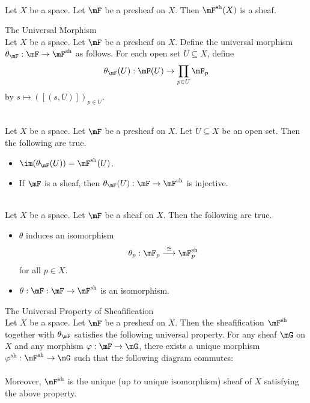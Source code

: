 \documentclass[a4paper]{article}
\begin{document}
\begin{lmm}{}{}\\
Let $X$ be a space. Let $\mF$ be a presheaf on $X$. Then $\mF^\text{sh}(X)$ is a sheaf. 
\end{lmm}

\begin{defn}{The Universal Morphism}{}\\
Let $X$ be a space. Let $\mF$ be a presheaf on $X$. Define the universal morphism $\theta_\mF:\mF\to\mF^\text{sh}$ as follows. For each open set $U\subseteq X$, define $$\theta_\mF(U):\mF(U)\to\prod_{p\in U}\mF_p$$ by $s\mapsto([(s,U)])_{p\in U}$. 
\end{defn}

\begin{lmm}{}{}\\
Let $X$ be a space. Let $\mF$ be a presheaf on $X$. Let $U\subseteq X$ be an open set. Then the following are true. 
\begin{itemize}
\item $\im(\theta_\mF(U))=\mF^\text{sh}(U)$. 
\item If $\mF$ is a sheaf, then $\theta_\mF(U):\mF\to\mF^\text{sh}$ is injective. 
\end{itemize}
\end{lmm}

\begin{lmm}{}{}\\
Let $X$ be a space. Let $\mF$ be a sheaf on $X$. Then the following are true. 
\begin{itemize}
\item $\theta$ induces an isomorphism $$\theta_p:\mF_p\overset{\cong}{\longrightarrow}\mF_p^\text{sh}$$ for all $p\in X$. 
\item $\theta:\mF:\mF\to\mF^\text{sh}$ is an isomorphism. 
\end{itemize}
\end{lmm}

\begin{prp}{The Universal Property of Sheafification}{}\\
Let $X$ be a space. Let $\mF$ be a presheaf on $X$. Then the sheafification $\mF^\text{sh}$ together with $\theta_\mF$ satisfies the following universal property. For any sheaf $\mG$ on $X$ and any morphism $\varphi:\mF\to\mG$, there exists a unique morphism $\varphi^\text{sh}:\mF^\text{sh}\to\mG$ such that the following diagram commutes: \\
\\
Moreover, $\mF^\text{sh}$ is the unique (up to unique isomorphism) sheaf of $X$ satisfying the above property. 
\end{prp}
\end{document}
